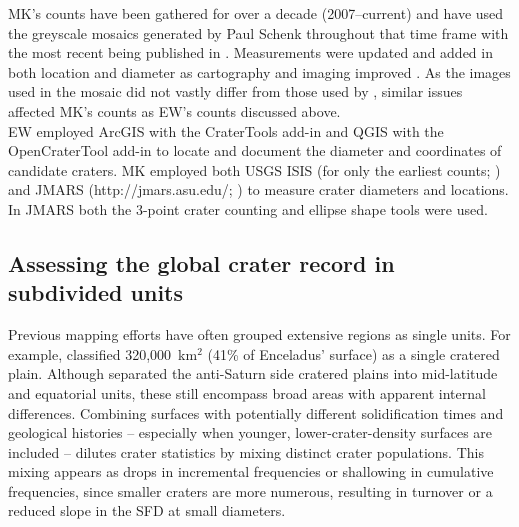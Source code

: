 \documentclass[preprint,11pt,3p,times,authoryear]{elsarticle}
\begin{document}
MK's counts have been gathered for over a decade (2007–current) and have used the greyscale mosaics generated by Paul Schenk throughout that time frame \citep{Schenk2011,Schenk2018} with the most recent being published in \citet{Schenk2024}. Measurements were updated and added in both location and diameter as cartography and imaging improved \citet{Kirchoff2016,Kirchoff2018}. As the images used in the mosaic did not vastly differ from those used by \citet{Bland2018}, similar issues affected MK's counts as EW's counts discussed above.\\

EW employed ArcGIS with the CraterTools add-in \citep{Kneissl2011} and QGIS with the OpenCraterTool add-in \citep{Heyer2023} to locate and document the diameter and coordinates of candidate craters. MK employed both USGS ISIS (for only the earliest counts; \citealt{Kirchoff2009}) and JMARS (http://jmars.asu.edu/; \citealt{Christensen2009}) to measure crater diameters and locations.  In JMARS both the 3-point crater counting and ellipse shape tools were used.

\subsection{Assessing the global crater record in subdivided units}
\label{subsec:units}
Previous mapping efforts have often grouped extensive regions as single units. For example, \citet{CrowWillard2015} classified 320,000~km$^{2}$ (41\% of Enceladus’ surface) as a single cratered plain. Although \citet{Kirchoff2009} separated the anti-Saturn side cratered plains into mid-latitude and equatorial units, these still encompass broad areas with apparent internal differences. Combining surfaces with potentially different solidification times and geological histories -- especially when younger, lower-crater-density surfaces are included -- dilutes crater statistics by mixing distinct crater populations. This mixing appears as drops in incremental frequencies or shallowing in cumulative frequencies, since smaller craters are more numerous, resulting in turnover or a reduced slope in the SFD at small diameters.\\
\end{document}
